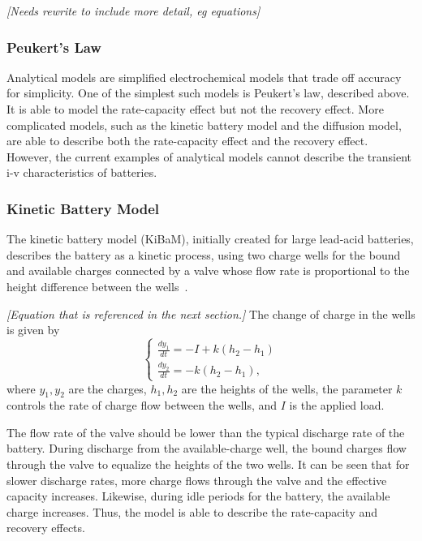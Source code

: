 \documentclass[../zhang_thesis.tex]{subfiles}
\begin{document}
\emph{[Needs rewrite to include more detail, eg equations]}

\subsubsection{Peukert's Law}

Analytical models are simplified electrochemical models that trade off accuracy for simplicity. One of the simplest such models is Peukert's law, described above. It is able to model the rate-capacity effect but not the recovery effect. More complicated models, such as the kinetic battery model and the diffusion model, are able to describe both the rate-capacity effect and the recovery effect. However, the current examples of analytical models cannot describe the transient i-v characteristics of batteries.

\subsubsection{Kinetic Battery Model}

The kinetic battery model (KiBaM), initially created for large lead-acid batteries, describes the battery as a kinetic process, using two charge wells for the bound and available charges connected by a valve whose flow rate is proportional to the height difference between the wells~\cite{manwell93}. 

\emph{[Equation that is referenced in the next section.]}
The change of charge in the wells is given by
\begin{equation}
    \begin{cases}
        \frac{dy_1}{dt} = -I + k \left( h_2 - h_1 \right) \\
        \frac{dy_2}{dt} = -k \left( h_2 - h_1 \right),
    \end{cases}
    \label{eq:kibam}
\end{equation}
where $y_1,y_2$ are the charges, $h_1,h_2$ are the heights of the wells, the parameter $k$ controls the rate of charge flow between the wells, and $I$ is the applied load.

The flow rate of the valve should be lower than the typical discharge rate of the battery. During discharge from the available-charge well, the bound charges flow through the valve to equalize the heights of the two wells. It can be seen that for slower discharge
rates, more charge flows through the valve and the effective capacity increases. Likewise, during idle periods for the battery, the available charge increases. Thus, the model is able to describe the rate-capacity and recovery effects.
\end{document}
